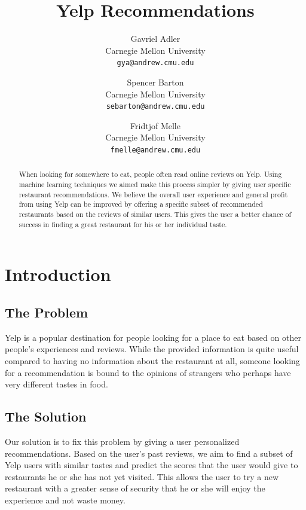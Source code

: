 \documentclass[10pt,twocolumn,letterpaper]{article}
\begin{document}
\title{Yelp Recommendations}

\author{
Gavriel Adler\\
Carnegie Mellon University\\
{\tt\small gya@andrew.cmu.edu}
\and
Spencer Barton\\
Carnegie Mellon University\\
{\tt\small sebarton@andrew.cmu.edu}
\and
Fridtjof Melle\\
Carnegie Mellon University\\
{\tt\small fmelle@andrew.cmu.edu}
}

\maketitle

\begin{abstract}
   When looking for somewhere to eat, people often read online reviews on Yelp. Using machine learning techniques we aimed make this process simpler by giving user specific restaurant recommendations. We believe the overall user experience and general profit from using Yelp can be improved by offering a specific subset of recommended restaurants based on the reviews of similar users. This gives the user a better chance of success in finding a great restaurant for his or her individual taste.  
\end{abstract}

\section{Introduction}

\subsection{The Problem}
Yelp is a popular destination for people looking for a place to eat based on other people's experiences and reviews. While the provided information is quite useful compared to having no information about the restaurant at all, someone looking for a recommendation is bound to the opinions of strangers who perhaps have very different tastes in food.
\subsection{The Solution}
Our solution is to fix this problem by giving a user personalized recommendations. Based on the user's past reviews, we aim to find a subset of Yelp users with similar tastes and predict the scores that the user would give to restaurants he or she has not yet visited. This allows the user to try a new restaurant with a greater sense of security that he or she will enjoy the experience and not waste money.
\end{document}
